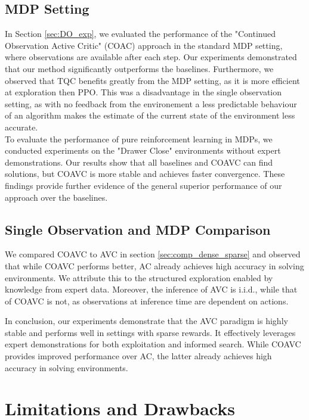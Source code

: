 \subsection{MDP Setting}
In Section \ref{sec:DO_exp}, we evaluated the performance of the "Continued Observation Active Critic" (COAC) approach in the standard MDP setting, 
where observations are available after each step. Our experiments demonstrated that our 
method significantly outperforms the baselines. Furthermore, we observed that TQC benefits greatly 
from the MDP setting, as it is more efficient at exploration then PPO. This was a disadvantage in the single observation setting, as with no feedback 
from the environement a less predictable behaviour of an algorithm makes the estimate of the current state of the environment less accurate.\\
To evaluate the performance of pure reinforcement learning in MDPs, we conducted experiments on the "Drawer Close" 
environments without expert demonstrations. Our results show that all baselines and COAVC can find solutions, but COAVC is more stable and achieves 
faster convergence. These findings provide further evidence of the general superior performance of our approach over the baselines. 

\subsection{Single Observation and MDP Comparison}
We compared COAVC to AVC in section \ref{sec:comp_dense_sparse} and observed that while COAVC performs better, 
AC already achieves high accuracy in solving environments. We attribute this to the structured exploration enabled by knowledge from 
expert data. Moreover, the inference of AVC is i.i.d., while that of COAVC is not, as observations at inference time are dependent on actions. 

In conclusion, our experiments demonstrate that the AVC paradigm is highly stable and performs well in settings with sparse rewards. 
It effectively leverages expert demonstrations for both exploitation and informed search. While COAVC provides improved performance over 
AC, the latter already achieves high accuracy in solving environments.

\section{Limitations and Drawbacks}
